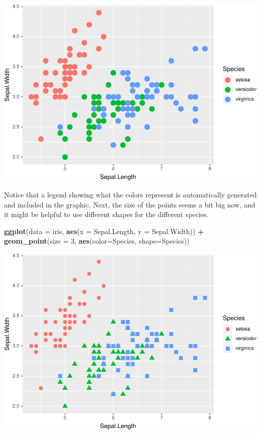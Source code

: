 \documentclass[]{krantz}
\makeatletter
\newenvironment{Shaded}{\begin{snugshade}}{\end{snugshade}}
\newcommand{\DataTypeTok}[1]{\textcolor[rgb]{0.27,0.27,0.27}{#1}}
\newcommand{\DecValTok}[1]{\textcolor[rgb]{0.06,0.06,0.06}{#1}}
\newcommand{\KeywordTok}[1]{\textcolor[rgb]{0.27,0.27,0.27}{\textbf{#1}}}
\newcommand{\NormalTok}[1]{#1}
\newcommand{\OperatorTok}[1]{\textcolor[rgb]{0.43,0.43,0.43}{\textbf{#1}}}
\newcommand{\StringTok}[1]{\textcolor[rgb]{0.5,0.5,0.5}{#1}}
\newenvironment{kframe}{%
\medskip{}
\setlength{\fboxsep}{.8em}
 \def\at@end@of@kframe{}%
 \ifinner\ifhmode%
  \def\at@end@of@kframe{\end{minipage}}%
  \begin{minipage}{\columnwidth}%
 \fi\fi%
 \def\FrameCommand##1{\hskip\@totalleftmargin \hskip-\fboxsep
 \colorbox{shadecolor}{##1}\hskip-\fboxsep
     \hskip-\linewidth \hskip-\@totalleftmargin \hskip\columnwidth}%
 \MakeFramed {\advance\hsize-\width
   \@totalleftmargin\z@ \linewidth\hsize
   \@setminipage}}%
 {\par\unskip\endMakeFramed%
 \at@end@of@kframe}
\renewenvironment{Shaded}{\begin{kframe}}{\end{kframe}}
\makeatother
\begin{document}
\includegraphics{bookdown_files/figure-latex/unnamed-chunk-59-1.pdf}

Notice that a legend showing what the colors represent is automatically generated and included in the graphic. Next, the size of the points seems a bit big now, and it might be helpful to use different shapes for the different species.

\begin{Shaded}
\begin{Highlighting}[]
\KeywordTok{ggplot}\NormalTok{(}\DataTypeTok{data =}\NormalTok{ iris, }\KeywordTok{aes}\NormalTok{(}\DataTypeTok{x =}\NormalTok{ Sepal.Length, }\DataTypeTok{y =}\NormalTok{ Sepal.Width)) }\OperatorTok{+}\StringTok{ }
\StringTok{    }\KeywordTok{geom_point}\NormalTok{(}\DataTypeTok{size =} \DecValTok{3}\NormalTok{, }\KeywordTok{aes}\NormalTok{(}\DataTypeTok{color=}\NormalTok{Species, }\DataTypeTok{shape=}\NormalTok{Species))}
\end{Highlighting}
\end{Shaded}

\includegraphics{bookdown_files/figure-latex/unnamed-chunk-60-1.pdf}
\end{document}

